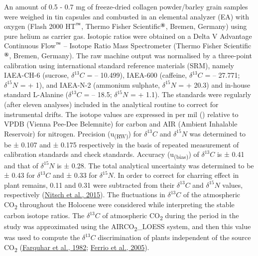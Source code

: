 \documentclass[preprint, 3p, authoryear]{elsarticle} %
\begin{document}
An amount of 0.5 - 0.7 mg of freeze-dried collagen powder/barley grain samples were weighed in tin capsules and combusted in an elemental analyzer (EA) with oxygen (Flash 2000 HT\(^\text{\texttrademark}\), Thermo Fisher Scientific\(^\text{\textregistered}\), Bremen, Germany) using pure helium as carrier gas. Isotopic ratios were obtained on a Delta V Advantage Continuous Flow\(^\text{\texttrademark}\) -- Isotope Ratio Mass Spectrometer (Thermo Fisher Scientific\(^\text{\textregistered}\), Bremen, Germany). The raw machine output was normalised by a three-point calibration using international standard reference materials (SRM), namely IAEA-CH-6 (sucrose, \(\delta ^{13}C\) = -- 10.499\text{\textperthousand}), IAEA-600 (caffeine, \(\delta ^{13}C\) = -- 27.771\text{\textperthousand}; \(\delta ^{15}N\) = + 1\text{\textperthousand}), and IAEA-N-2 (ammonium sulphate, \(\delta ^{15}N\) = + 20.3\text{\textperthousand}) and in-house standard L-Alanine (\(\delta ^{13}C\) = -- 18.5\text{\textperthousand}; \(\delta ^{15}N\) = + 1.1\text{\textperthousand}). The standards were regularly (after eleven analyses) included in the analytical routine to correct for instrumental drifts. The isotope values are expressed in per mil (\text{\textperthousand}) relative to VPDB (Vienna Pee-Dee Belemnite) for carbon and AIR (Ambient Inhalable Reservoir) for nitrogen. Precision (u\textsubscript{(RW)}) for \(\delta ^{13}C\) and \(\delta ^{15}N\) was determined to be ± 0.107 and ± 0.175 respectively in the basis of repeated measurement of calibration standards and check standards. Accuracy (u\textsubscript{(bias)}) of \(\delta ^{13}C\) is ± 0.41 and that of \(\delta ^{15}N\) is ± 0.28. The total analytical uncertainty was determined to be ± 0.43 for \(\delta ^{13}C\) and ± 0.33 for \(\delta ^{15}N\). In order to correct for charring effect in plant remains, 0.11\text{\textperthousand} and 0.31\text{\textperthousand} were subtracted from their \(\delta ^{13}C\) and \(\delta ^{15}N\) values, respectively (\protect\hyperlink{ref-nitsch_etal15}{Nitsch et al., 2015}). The fluctuations in \(\delta ^{13}C\) of the atmospheric CO\textsubscript{2} throughout the Holocene were considered while interpreting the stable carbon isotope ratios. The \(\delta ^{13}C\) of atmospheric CO\textsubscript{2} during the period in the study was approximated using the AIRCO\textsubscript{2}\_LOESS system, and then this value was used to compute the \(\delta ^{13}C\) discrimination of plants independent of the source CO\textsubscript{2} (\protect\hyperlink{ref-farquhar_etal82}{Farquhar et al., 1982}; \protect\hyperlink{ref-ferrio_etal05}{Ferrio et al., 2005}).
\end{document}
